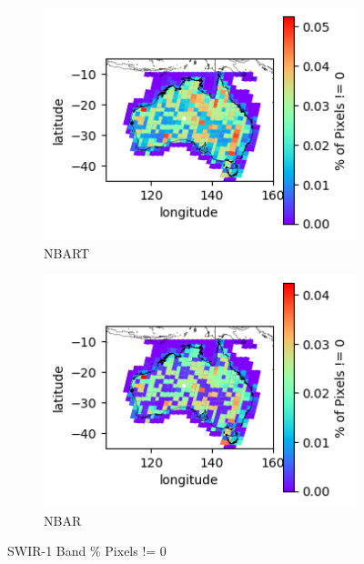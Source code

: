 \documentclass[a4paper]{article}
\begin{document}
      \begin{figure}[h!]
        \centering
          \begin{subfigure}[l]{.4\linewidth}
            \hspace{-32mm}
            \includegraphics[scale=0.9]{plots/nbart/nbart_swir_1-PercentDifferent.png}
            \caption{NBART}
          \end{subfigure}
%
          \begin{subfigure}[r]{.4\linewidth}
            \includegraphics[scale=0.9]{plots/nbar/nbar_swir_1-PercentDifferent.png}
            \caption{NBAR}
          \end{subfigure}
        \caption{SWIR-1 Band \% Pixels != 0}\label{figure:20}
      \end{figure}

  \clearpage
\end{document}
